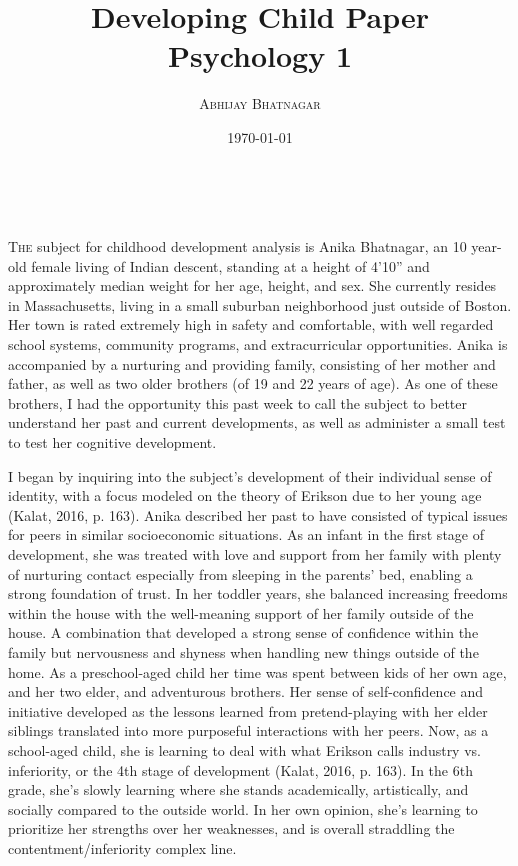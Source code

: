 \documentclass[a4paper, 10pt]{article}
\title{\textbf{Developing Child Paper}
\\ Psychology 1}
\author{\textsc{Abhijay Bhatnagar}}
\date{\today}
\makeatletter
\renewcommand{\maketitle}{
\begin{flushright}
{\LARGE\@title}

\vspace{0pt}

{\large\@author}
\\\@date

\vspace{0pt}
\end{flushright}
}
\makeatother
\begin{document}
\maketitle
\lettrine{T}{he} subject for childhood development analysis is Anika Bhatnagar, an 10 year-old female living of Indian descent, standing at a height of 4'10'' and approximately median weight for her age, height, and sex. She currently resides in Massachusetts, living in a small suburban neighborhood just outside of Boston. Her town is rated extremely high in safety and comfortable, with well regarded school systems, community programs, and extracurricular opportunities. Anika is accompanied by a nurturing and providing family, consisting of her mother and father, as well as two older brothers (of 19 and 22 years of age). As one of these brothers, I had the opportunity this past week to call the subject to better understand her past and current developments, as well as administer a small test to test her cognitive development.

	I began by inquiring into the subject's development of their individual sense of identity, with a focus modeled on the theory of Erikson due to her young age (Kalat, 2016, p. 163). Anika described her past to have consisted of typical issues for peers in similar socioeconomic situations. As an infant in the first stage of development, she was treated with love and support from her family with plenty of nurturing contact especially from sleeping in the parents' bed, enabling a strong foundation of trust. In her toddler years, she balanced increasing freedoms within the house with the well-meaning support of her family outside of the house. A combination that developed a strong sense of confidence within the family but nervousness and shyness when handling new things outside of the home. As a preschool-aged child her time was spent between kids of her own age, and her two elder, and adventurous brothers. Her sense of self-confidence and initiative developed as the lessons learned from pretend-playing with her elder siblings translated into more purposeful interactions with her peers. Now, as a school-aged child, she is learning to deal with what Erikson calls industry vs. inferiority, or the 4th stage of development (Kalat, 2016, p. 163). In the 6th grade, she's slowly learning where she stands academically, artistically, and socially compared to the outside world. In her own opinion, she's learning to prioritize her strengths over her weaknesses, and is overall straddling the contentment/inferiority complex line. 
	
\end{document}
